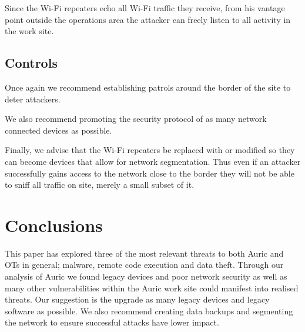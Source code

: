 \documentclass{article}
\begin{document}
\begin{multicols}{2}
    Since the Wi-Fi repeaters echo all Wi-Fi traffic they receive,
    from his vantage point outside the operations area the attacker
    can freely listen to all activity in the work site.

    \subsection{Controls}
    Once again we recommend establishing patrols around the border of the site
    to deter attackers.

    We also recommend promoting the security protocol of as many network
    connected devices
    as possible.

    Finally, we advise that the Wi-Fi repeaters be replaced with
    or modified so they can become devices that
    allow for network segmentation. Thus even if an attacker successfully gains
    access to the network close to the border they will not be able to sniff
    all traffic on site, merely a small subset of it.

    \section{Conclusions}
    This paper has explored three of the most relevant threats to both Auric
    and OTs in general; malware, remote code execution and
    data theft. Through our analysis of Auric we found
    legacy devices and poor network security as well as many other
    vulnerabilities within the Auric work site could manifest into
    realised threats.
    Our suggestion is the upgrade as many legacy devices and legacy software as
    possible. We also recommend creating data backups and
    segmenting the network to ensure successful
    attacks have lower impact.

    
    
\end{multicols}
\end{document}
